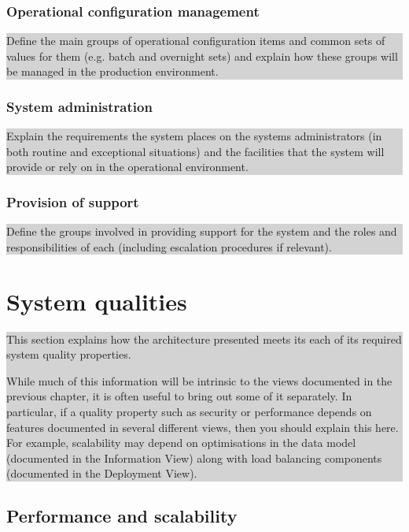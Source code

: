 \documentclass[a4paper,11pt]{report}
\newcommand{\instructions}[1]{
  \noindent\colorbox{lightgray}{%
    \parbox{\linewidth}{%
      #1
    }%
  }%
 \vspace{0.1cm}
}
\begin{document}
\subsection{Operational configuration management}
\label{sec:oper-conf-manag}

\instructions{
Define the main groups of operational configuration items and common
sets of values for them (e.g. batch and overnight sets) and explain
how these groups will be managed in the production environment.
}

\subsection{System administration}
\label{sec:syst-admin}

\instructions{
Explain the requirements the system places on the systems
administrators (in both routine and exceptional situations) and the
facilities that the system will provide or rely on in the operational
environment.
}

\subsection{Provision of support}
\label{sec:provision-support}

\instructions{
Define the groups involved in providing support for the system and the
roles and responsibilities of each (including escalation procedures if
relevant).
}

\chapter{System qualities}
\label{cha:system-qualities}
\thispagestyle{fancy}

\instructions{
This section explains how the architecture presented
  meets its each of its required system quality properties.

While much of this information will be intrinsic to the views
documented in the previous chapter, it is often useful to bring out
some of it separately. In particular, if a quality property such as
security or performance depends on features documented in several
different views, then you should explain this here. For example,
scalability may depend on optimisations in the data model (documented
in the Information View) along with load balancing components
(documented in the Deployment View).
}

\section{Performance and scalability}
\label{sec:perf-scal}
\end{document}
